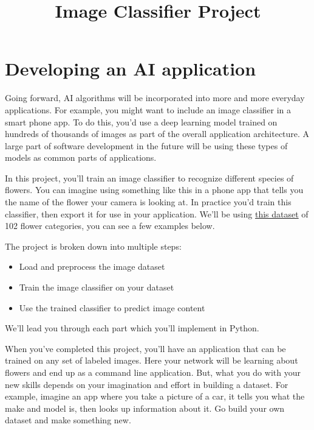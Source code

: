 \documentclass[11pt]{article}
\title{Image Classifier Project}
\providecommand{\tightlist}{%
      \setlength{\itemsep}{0pt}\setlength{\parskip}{0pt}}
\begin{document}
    
    
    \maketitle
    
    

    
    \hypertarget{developing-an-ai-application}{%
\section{Developing an AI
application}\label{developing-an-ai-application}}

Going forward, AI algorithms will be incorporated into more and more
everyday applications. For example, you might want to include an image
classifier in a smart phone app. To do this, you'd use a deep learning
model trained on hundreds of thousands of images as part of the overall
application architecture. A large part of software development in the
future will be using these types of models as common parts of
applications.

In this project, you'll train an image classifier to recognize different
species of flowers. You can imagine using something like this in a phone
app that tells you the name of the flower your camera is looking at. In
practice you'd train this classifier, then export it for use in your
application. We'll be using
\href{http://www.robots.ox.ac.uk/~vgg/data/flowers/102/index.html}{this
dataset} of 102 flower categories, you can see a few examples below.

The project is broken down into multiple steps:

\begin{itemize}
\tightlist
\item
  Load and preprocess the image dataset
\item
  Train the image classifier on your dataset
\item
  Use the trained classifier to predict image content
\end{itemize}

We'll lead you through each part which you'll implement in Python.

When you've completed this project, you'll have an application that can
be trained on any set of labeled images. Here your network will be
learning about flowers and end up as a command line application. But,
what you do with your new skills depends on your imagination and effort
in building a dataset. For example, imagine an app where you take a
picture of a car, it tells you what the make and model is, then looks up
information about it. Go build your own dataset and make something new.
\end{document}
